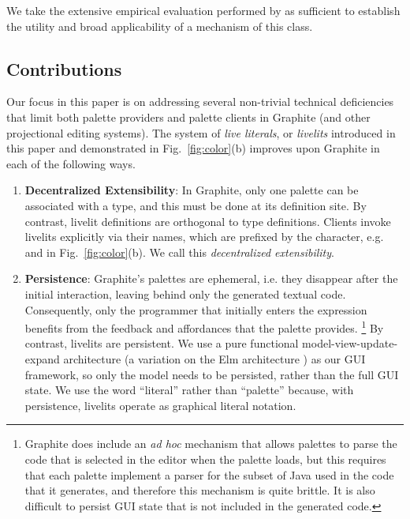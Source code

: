 We take the extensive empirical evaluation performed by \citet{Graphite} as sufficient to establish
the utility and broad applicability of a mechanism of this class.

\subsection{Contributions}

Our focus in this paper is on addressing several non-trivial technical
deficiencies that limit both palette providers and palette clients in Graphite
(and other projectional editing systems).
The system of \emph{live literals}, or \emph{livelits} introduced in
this paper and demonstrated in Fig.~\ref{fig:color}(b) improves upon Graphite
in each of the following ways.
\begin{enumerate}
  \setlength\itemsep{0.5em}
  \item \textbf{Decentralized Extensibility}:
    In Graphite, only one palette can be associated with a type, and this must
    be done at its definition site.
    By contrast, livelit definitions are orthogonal to type definitions.
    Clients invoke livelits explicitly via their names, which are prefixed by the \li{\$} character,
    e.g.  and  in Fig.~\ref{fig:color}(b).
    We call this \emph{decentralized extensibility}.
  \item \textbf{Persistence}: Graphite's palettes are {ephemeral},
  i.e. they disappear after the initial interaction,
  leaving behind only the generated textual code.
  Consequently, only the programmer that initially enters the expression
  benefits from the feedback and affordances that the palette provides.%
  \footnote{Graphite does include an \emph{ad hoc} mechanism that
  allows palettes to parse the code that is selected in the editor
  when the palette loads, but this requires that each palette implement
  a parser for the subset of Java used in the code that it generates,
  and therefore this mechanism is quite brittle. It is also difficult
  to persist GUI state that is not included in the generated code.}
  By contrast, livelits are persistent. We use a pure functional model-view-update-expand architecture
  (a variation on the Elm architecture \cite{ElmArchitecture}) as our GUI framework,
  so only the model needs to be persisted, rather than the full GUI state.
  We use the word ``literal'' rather than ``palette'' because, with persistence, livelits
  operate as graphical literal notation.


\end{enumerate}
